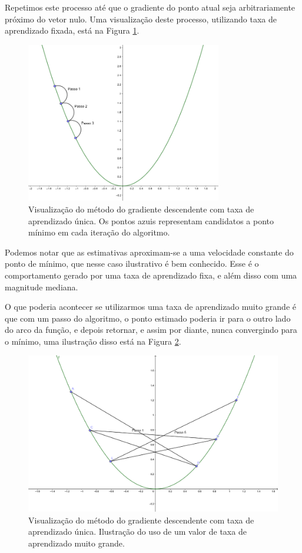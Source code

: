 Repetimos este processo até que o gradiente do ponto atual seja arbitrariamente próximo do vetor nulo. Uma visualização deste processo, utilizando taxa de aprendizado fixada, está na Figura \ref{fig:grad_1}.

\begin{figure}[htb]
\centering
\includegraphics[height=7cm]{figuras/grad_1}
\caption{Visualização do método do gradiente descendente com taxa de aprendizado única. Os pontos azuis representam candidatos a ponto mínimo em cada iteração do algoritmo.}
\label{fig:grad_1}
\end{figure}

Podemos notar que as estimativas aproximam-se a uma velocidade constante do ponto de mínimo, que nesse caso ilustrativo é bem conhecido. Esse é o comportamento gerado por uma taxa de aprendizado fixa, e além disso com uma magnitude mediana. 

O que poderia acontecer se utilizarmos uma taxa de aprendizado muito grande é que com um passo do algoritmo, o ponto estimado poderia ir para o outro lado do arco da função, e depois retornar, e assim por diante, nunca convergindo para o mínimo, uma ilustração disso está na Figura \ref{fig:grad_2}.

\begin{figure}[htb]
\centering
\includegraphics[height=7cm]{figuras/grad_2}
\caption{Visualização do método do gradiente descendente com taxa de aprendizado única. Ilustração do uso de um valor de taxa de aprendizado muito grande.}
\label{fig:grad_2}
\end{figure}

